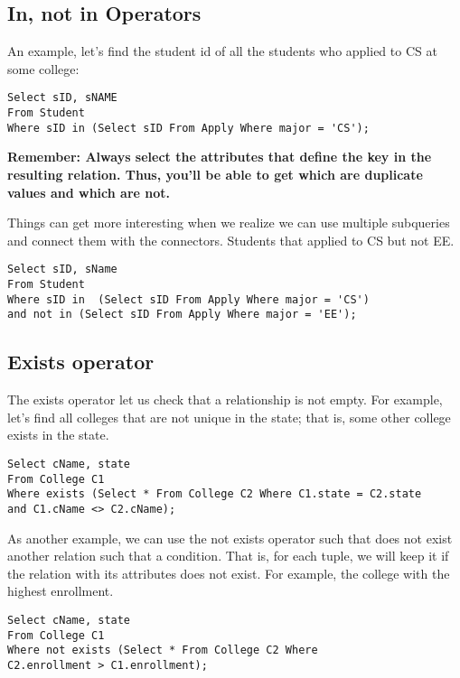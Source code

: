 \documentclass[11pt, oneside]{article}   	%
\begin{document}
\subsection{In, not in Operators}

An example, let's find the student id of all the students who applied to CS at some college:

\begin{lstlisting}
Select sID, sNAME
From Student
Where sID in (Select sID From Apply Where major = 'CS');
\end{lstlisting}

\textbf{Remember: Always select the attributes that define the key in the resulting relation. Thus, you'll be able to get which are duplicate values and which are not.}

Things can get more interesting when we realize we can use multiple subqueries and connect them with the connectors. Students that applied to CS but not EE. 

\begin{lstlisting}
Select sID, sName
From Student
Where sID in  (Select sID From Apply Where major = 'CS') 
and not in (Select sID From Apply Where major = 'EE');
\end{lstlisting}

\subsection{Exists operator}

The exists operator let us check that a relationship is not empty. For example, let's find all colleges that are not unique in the state; that is, some other college exists in the state.

\begin{lstlisting}
Select cName, state
From College C1
Where exists (Select * From College C2 Where C1.state = C2.state
and C1.cName <> C2.cName);
\end{lstlisting}

As another example, we can use the not exists operator such that does not exist another relation such that a condition. That is, for each tuple, we will keep it if the relation with its attributes does not exist. For example, the college with the highest enrollment. 

\begin{lstlisting}
Select cName, state
From College C1
Where not exists (Select * From College C2 Where
C2.enrollment > C1.enrollment);
\end{lstlisting}
\end{document}
